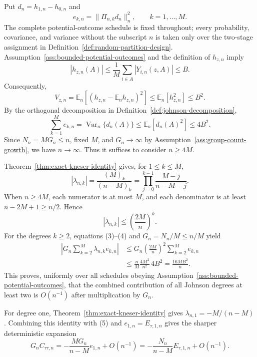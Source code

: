 Put \(d_n=h_{1,n}-h_{0,n}\) and
\[
e_{k,n}=\|\Pi_{n,k}d_n\|_n^2,
\qquad k=1,\ldots,M.
\]
The complete potential-outcome schedule is fixed throughout; every probability, covariance, and variance without the subscript \(n\) is taken only over the two-stage assignment in Definition~\ref{def:random-partition-design}.
Assumption~\ref{ass:bounded-potential-outcomes} and the definition of \(h_{z,n}\) imply
\[
|h_{z,n}(A)|
\leq \frac{1}{M}\sum_{i\in A}|Y_{i,n}(z,A)|
\leq B.                                                     \tag{1}
\]
Consequently,
\[
V_{z,n}
=\mathbb E_n\!\left[(h_{z,n}-\mathbb E_nh_{z,n})^2\right]
\leq \mathbb E_n[h_{z,n}^2]
\leq B^2.                                                   \tag{2}
\]
By the orthogonal decomposition in Definition~\ref{def:johnson-decomposition},
\[
\sum_{k=1}^M e_{k,n}
=\operatorname{Var}_n\{d_n(A)\}
\leq \mathbb E_n[d_n(A)^2]
\leq 4B^2.                                                  \tag{3}
\]
Since \(N_n=MG_n\leq n\), fixed \(M\), and \(G_n\to\infty\) by Assumption~\ref{ass:group-count-growth}, we have \(n\to\infty\).  Thus it suffices to consider \(n\geq4M\).

Theorem~\ref{thm:exact-kneser-identity} gives, for \(1\leq k\leq M\),
\[
|\lambda_{n,k}|
=\frac{(M)_k}{(n-M)_k}
=\prod_{j=0}^{k-1}\frac{M-j}{n-M-j}.
\]
When \(n\geq4M\), each numerator is at most \(M\), and each denominator is at least \(n-2M+1\geq n/2\).  Hence
\[
|\lambda_{n,k}|\leq\left(\frac{2M}{n}\right)^k.            \tag{4}
\]
For the degrees \(k\geq2\), equations (3)--(4) and \(G_n=N_n/M\leq n/M\) yield
\[
\begin{aligned}
\left|G_n\sum_{k=2}^M\lambda_{n,k}e_{k,n}\right|
&\leq G_n\left(\frac{2M}{n}\right)^2
       \sum_{k=2}^M e_{k,n}\\
&\leq \frac{n}{M}\frac{4M^2}{n^2}\,4B^2
=\frac{16MB^2}{n}.                                         \tag{5}
\end{aligned}
\]
This proves, uniformly over all schedules obeying Assumption~\ref{ass:bounded-potential-outcomes}, that the combined contribution of all Johnson degrees at least two is \(O(n^{-1})\) after multiplication by \(G_n\).

For degree one, Theorem~\ref{thm:exact-kneser-identity} gives \(\lambda_{n,1}=-M/(n-M)\).  Combining this identity with (5) and \(e_{1,n}=E_{\tau,1,n}\) gives the sharper deterministic expansion
\[
G_nC_{\tau\tau,n}
=-\frac{MG_n}{n-M}e_{1,n}+O(n^{-1})
=-\frac{N_n}{n-M}E_{\tau,1,n}+O(n^{-1}).                   \tag{6}
\]

